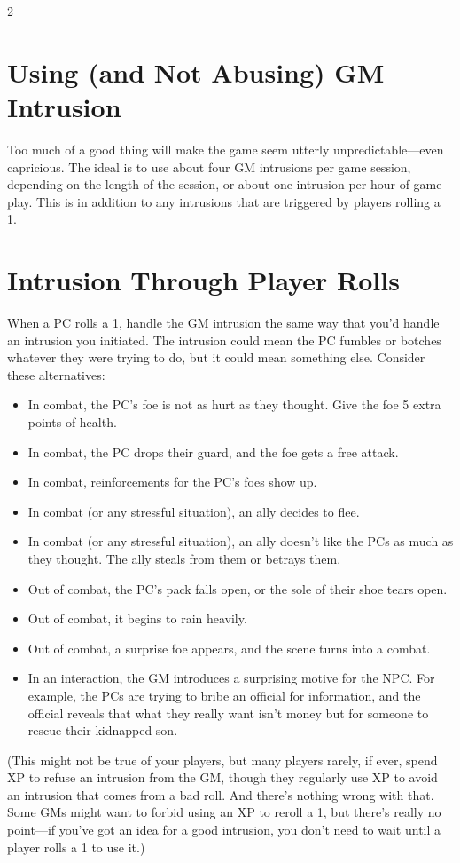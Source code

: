 \begin{multicols}{2}
\section{Using (and Not Abusing) GM Intrusion} 

Too much of a good thing will make the game seem utterly unpredictable—even capricious. The ideal is to use about four GM intrusions per game session, depending on the length of the session, or about one intrusion per hour of game play. This is in addition to any intrusions that are triggered by players rolling a 1.

\section{Intrusion Through Player Rolls}

When a PC rolls a 1, handle the GM intrusion the same way that you’d handle an intrusion you initiated. The intrusion could mean the PC fumbles or botches whatever they were trying to do, but it could mean something else. Consider these alternatives:

\begin{itemize}
\item In combat, the PC’s foe is not as hurt as they thought. Give the foe 5 extra points of health.
\item In combat, the PC drops their guard, and the foe gets a free attack.
\item In combat, reinforcements for the PC’s foes show up.
\item In combat (or any stressful situation), an ally decides to flee.
\item In combat (or any stressful situation), an ally doesn’t like the PCs as much as they thought. The ally steals from them or betrays them.
\item Out of combat, the PC’s pack falls open, or the sole of their shoe tears open.
\item Out of combat, it begins to rain heavily.
\item Out of combat, a surprise foe appears, and the scene turns into a combat.
\item In an interaction, the GM introduces a surprising motive for the NPC. For example, the PCs are trying to bribe an official for information, and the official reveals that what they really want isn’t money but for someone to rescue their kidnapped son.
\end{itemize}

(This might not be true of your players, but many players rarely, if ever, spend XP to refuse an intrusion from the GM, though they regularly use XP to avoid an intrusion that comes from a bad roll. And there’s nothing wrong with that. Some GMs might want to forbid using an XP to reroll a 1, but there’s really no point—if you’ve got an idea for a good intrusion, you don’t need to wait until a player rolls a 1 to use it.)


\end{multicols}
